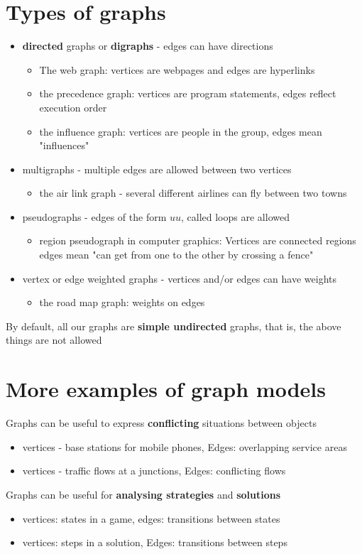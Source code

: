 \documentclass{article}[18pt]
\begin{document}
\section{Types of graphs}
\begin{itemize}
	\item \textbf{directed} graphs or \textbf{digraphs} - edges can have directions
	\begin{itemize}
		\item The web graph: vertices are webpages and edges are hyperlinks
		\item the precedence graph: vertices are program statements, edges reflect execution order
		\item the influence graph: vertices are people in the group, edges mean "influences"
	\end{itemize}
	\item multigraphs - multiple edges are allowed between two vertices
	\begin{itemize}
		\item the air link graph - several different airlines can fly between two towns
	\end{itemize}
	\item pseudographs - edges of the form $uu$, called loops are allowed
	\begin{itemize}
		\item region pseudograph in computer graphics: Vertices are connected regions edges mean "can get from one to the other by crossing a fence"
	\end{itemize}
	\item vertex or edge weighted graphs - vertices and/or edges can have weights
	\begin{itemize}
		\item the road map graph: weights on edges 
	\end{itemize}
\end{itemize}
By default, all our graphs are \textbf{simple undirected} graphs, that is, the above things are not allowed
\section{More examples of graph models}
Graphs can be useful to express \textbf{conflicting} situations between objects
\begin{itemize}
	\item vertices - base stations for mobile phones, Edges: overlapping service areas
	\item vertices - traffic flows at a junctions, Edges: conflicting flows
\end{itemize}
Graphs can be useful for \textbf{analysing strategies} and \textbf{solutions}
\begin{itemize}
	\item vertices: states in a game, edges: transitions between states
	\item vertices: steps in a solution, Edges: transitions between steps
\end{itemize}
\end{document}
